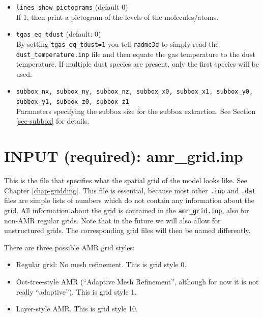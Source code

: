 \documentclass{report}
\begin{document}
\begin{itemize}
\item {\small\tt lines\_show\_pictograms} (default 0)\\
  If 1, then print a pictogram of the levels of the molecules/atoms.
\item {\small\tt tgas\_eq\_tdust} (default: 0)\\
  By setting {\small\tt tgas\_eq\_tdust=1} you tell {\small\tt radmc3d} to
  simply read the {\small\tt dust\_temperature.inp} file and then equate
  the gas temperature to the dust temperature. If multiple dust species
  are present, only the first species will be used.
\item {\small\tt subbox\_nx, subbox\_ny, subbox\_nz, subbox\_x0, subbox\_x1, 
    subbox\_y0, subbox\_y1, subbox\_z0, subbox\_z1}\\
  Parameters specifying the subbox size for the subbox extraction.
  See Section \ref{sec-subbox} for details.
\end{itemize}



\section{INPUT (required): amr\_grid.inp}
\label{sec-grid-input}
%
This is the file that specifies what the spatial grid of the model looks
like. See Chapter \ref{chap-gridding}. This file is essential, because most
other {\small\tt .inp} and {\small\tt .dat} files are simple lists of
numbers which do not contain any information about the grid. All information
about the grid is contained in the {\small\tt amr\_grid.inp}, also for
non-AMR regular grids. Note that in the future we will also allow for
unstructured grids. The corresponding grid files will then be named
differently.  

There are three possible AMR grid styles:
\begin{itemize}
\item Regular grid: No mesh refinement. This is grid style 0.
\item Oct-tree-style AMR (``Adaptive Mesh Refinement'', although for now it
  is not really ``adaptive''). This is grid style 1.
\item Layer-style AMR. This is grid style 10.
\end{itemize}
\end{document}
